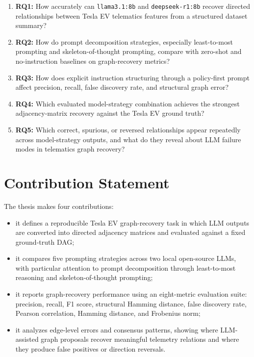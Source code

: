 \begin{enumerate}
  \item \textbf{RQ1:} How accurately can \texttt{llama3.1:8b} and
  \texttt{deepseek-r1:8b} recover directed relationships between Tesla EV
  telematics features from a structured dataset summary?

  \item \textbf{RQ2:} How do prompt decomposition strategies, especially
  least-to-most prompting and skeleton-of-thought prompting, compare with
  zero-shot and no-instruction baselines on graph-recovery metrics?

  \item \textbf{RQ3:} How does explicit instruction structuring through a
  policy-first prompt affect precision, recall, false discovery rate, and
  structural graph error?

  \item \textbf{RQ4:} Which evaluated model-strategy combination achieves the
  strongest adjacency-matrix recovery against the Tesla EV ground truth?

  \item \textbf{RQ5:} Which correct, spurious, or reversed relationships
  appear repeatedly across model-strategy outputs, and what do they reveal
  about LLM failure modes in telematics graph recovery?
\end{enumerate}

\section{Contribution Statement}

The thesis makes four contributions:

\begin{itemize}
  \item it defines a reproducible Tesla EV graph-recovery task in which LLM
  outputs are converted into directed adjacency matrices and evaluated against
  a fixed ground-truth DAG;

  \item it compares five prompting strategies across two local open-source
  LLMs, with particular attention to prompt decomposition through
  least-to-most reasoning and skeleton-of-thought prompting;

  \item it reports graph-recovery performance using an eight-metric evaluation
  suite: precision, recall, F1 score, structural Hamming distance, false
  discovery rate, Pearson correlation, Hamming distance, and Frobenius norm;

  \item it analyzes edge-level errors and consensus patterns, showing where
  LLM-assisted graph proposals recover meaningful telemetry relations and
  where they produce false positives or direction reversals.
\end{itemize}

